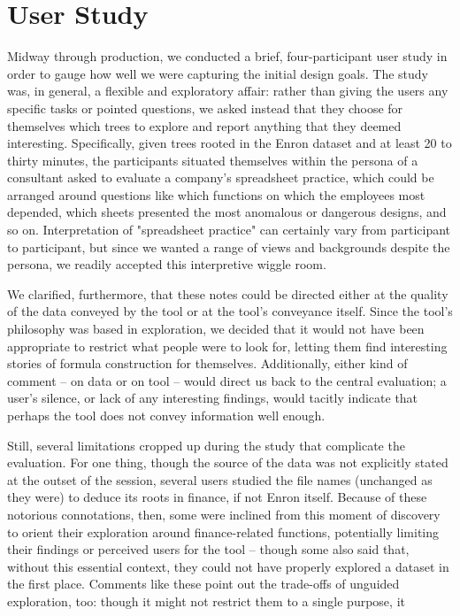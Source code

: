 \documentclass[conference]{IEEEtran}
\begin{document}
\section{User Study}
Midway through production, we conducted a brief, four-participant user study in order to gauge how well we were capturing the initial
design goals. The study was, in general, a flexible and exploratory
affair: rather than giving the users any specific tasks or pointed
questions, we asked instead that they choose for themselves which trees to explore and report anything that they deemed interesting. 
Specifically, given trees rooted in the Enron dataset and at least 20 to thirty minutes, the participants situated themselves within the persona 
of a consultant asked to evaluate a company's spreadsheet practice, which could be arranged around questions like which functions on which the
employees most depended, which sheets presented the most anomalous or dangerous designs, and so on. Interpretation of "spreadsheet practice" can certainly vary from participant to participant, but since we wanted a range of views and backgrounds despite the persona, we readily accepted
this interpretive wiggle room. \par
We clarified, furthermore, that these notes could be directed either at the quality of the data conveyed by the tool or at the tool's conveyance
itself. Since the tool's philosophy was based in exploration, we
decided that it would not have been appropriate to restrict what people
were to look for, letting them find interesting stories of formula 
construction for themselves. Additionally, either kind of comment -- on data or on tool -- would direct us back to the central evaluation; a user's
silence, or lack of any interesting findings, would tacitly indicate that
perhaps the tool does not convey information well enough. \par 
Still, several limitations cropped up during the study that complicate
the evaluation. For one thing, though the source of the data was not 
explicitly stated at the outset of the session, several users studied the file names (unchanged as they were) to deduce its roots in finance, if not
Enron itself. Because of these notorious connotations, then, some were
inclined from this moment of discovery to orient their exploration around finance-related functions, potentially limiting their findings or perceived
users for the tool -- though some also said that, without this essential 
context, they could not have properly explored a dataset in the first place. Comments like these point out the trade-offs of unguided exploration, too: though it might not restrict them to a single purpose, it
\end{document}
